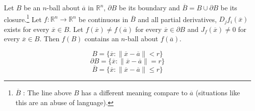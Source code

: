 \begin{theorem}
	Let $B$ be an $n$-ball about $\overline{a}$ in $\mathbb{R}^n$, $\partial B$ be its boundary and $\overline{B} = B \cup \partial B$ be its closure.\footnote{$\overline{B}$ : The line above $B$ has a different meaning compare to $\overline{a}$ (situations like this are an abuse of language).} Let $f : \mathbb{R}^n \to \mathbb{R}^n$ be continuous in $\overline{B}$ and all partial derivatives, $D_jf_i(\overline{x})$ exists for every $\overline{x} \in B$. Let $f(\overline{x}) \ne f(\overline{a})$ for every $\overline{x} \in \partial B$ and $J_f(\overline{x}) \ne 0$ for every $\overline{x} \in B$. Then $f(B)$ contains an $n$-ball about $f(\overline{a})$.
\begin{commentary}
	\[ B = \{ \overline{x} : \| \overline{x} - \overline{a} \| < r \} \]
	\[ \partial B = \{ \overline{x} : \| \overline{x} - \overline{a} \| = r \} \]
	\[ \overline{B} = \{ \overline{x} : \| \overline{x} - \overline{a} \| \le r \} \]
\end{commentary}
\end{theorem}
